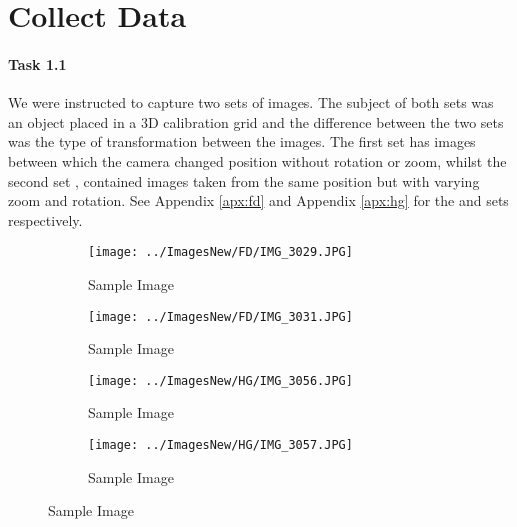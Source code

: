 \section{ Collect Data}

\paragraph{Task 1.1} We were instructed to capture two sets of images. The subject of both sets was an object placed in a 3D calibration grid and the difference between the two sets was the type of transformation between the images. The first set \FD has images between which the camera changed position without rotation or zoom, whilst the second set \HG, contained images taken from the same position but with varying zoom and rotation. See Appendix \ref{apx:fd} and Appendix \ref{apx:hg} for the \FD and \HG sets respectively.

\begin{figure}[ht]
\begin{center}
   \begin{subfigure}{0.49\linewidth}
   \centering
   \texttt{[image: ../ImagesNew/FD/IMG\_3029.JPG]}
   \caption{\FD Sample Image}
   \label{fd:subfig:1}
   \end{subfigure}
   \begin{subfigure}{0.49\linewidth}
   \centering
   \texttt{[image: ../ImagesNew/FD/IMG\_3031.JPG]}
   \caption{\FD Sample Image}
   \label{fd:subfig:2}
   \end{subfigure}
\newline
   \begin{subfigure}{0.49\linewidth}
   \centering
   \texttt{[image: ../ImagesNew/HG/IMG\_3056.JPG]}
   \caption{\HG Sample Image}
   \label{hg:subfig:1}
   \end{subfigure}
   \begin{subfigure}{0.49\linewidth}
   \centering
   \texttt{[image: ../ImagesNew/HG/IMG\_3057.JPG]}
   \caption{\HG Sample Image}
   \label{hg:subfig:2}
   \end{subfigure}
\end{center}
\label{fig:1}
\end{figure}